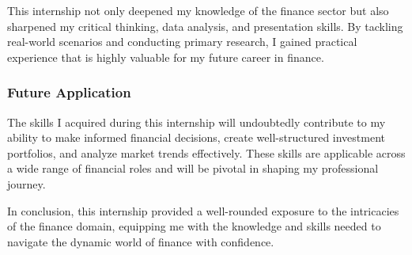 This internship not only deepened my knowledge of the finance sector but also sharpened my critical thinking, data analysis, and presentation skills. By tackling real-world scenarios and conducting primary research, I gained practical experience that is highly valuable for my future career in finance.

\subsubsection{Future Application}

The skills I acquired during this internship will undoubtedly contribute to my ability to make informed financial decisions, create well-structured investment portfolios, and analyze market trends effectively. These skills are applicable across a wide range of financial roles and will be pivotal in shaping my professional journey.

In conclusion, this internship provided a well-rounded exposure to the intricacies of the finance domain, equipping me with the knowledge and skills needed to navigate the dynamic world of finance with confidence.

